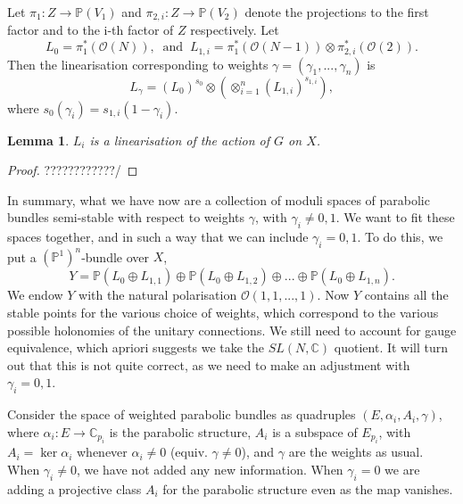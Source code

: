 \documentclass[]{article}
\newtheorem{lemma}{Lemma}
\newcommand{\C}{\mathbb{C}}
\newcommand{\OO}{\mathcal{O}}
\newcommand{\PP}{\mathbb{P}}
\begin{document}
	
	Let $\pi_1:Z \to \PP(V_1)$ and $\pi_{2,i}:Z\to \PP(V_2)$ denote the projections to the first factor and to the i-th factor of $Z$ respectively. Let
	\begin{equation}
		L_0 = \pi_1^\ast(\OO(N)),~ \text{ and } ~ L_{1,i} = \pi_1^\ast(\OO(N-1))\otimes \pi_{2,i}^\ast (\OO(2)).
	\end{equation}
	Then the linearisation corresponding to weights $\gamma = (\gamma_1,...,\gamma_n)$ is 
	\begin{equation}
		L_\gamma = (L_0)^{s_0} \otimes \left(
		\otimes_{i=1}^n (L_{1,i})^{s_{1,i}}
		\right),
	\end{equation}
	where $s_0(\gamma_i) = s_{1,i}(1-\gamma_i)$.
	\begin{lemma}
		$L_i$ is a linearisation of the action of $G$ on $X$.
	\end{lemma}
	\begin{proof}
		????????????/
	\end{proof}
	In summary, what we have now are a collection of moduli spaces of parabolic bundles semi-stable with respect to weights $\gamma$, with $\gamma_i \neq 0,1$. We want to fit these spaces together, and in such a way that we can include $\gamma_i = 0,1$. To do this, we put a $(\PP^1)^n$-bundle over $X$,
	\begin{equation}
		Y = \PP(L_0\oplus L_{1,1})\oplus \PP(L_0\oplus L_{1,2})\oplus ... \oplus \PP(L_0\oplus L_{1,n}).
	\end{equation}
	We endow $Y$ with the natural polarisation $\OO(1,1,...,1)$. Now $Y$ contains all the stable points for the various choice of weights, which correspond to the various possible holonomies of the unitary connections. We still need to account for gauge equivalence, which apriori suggests we take the $SL(N,\C)$ quotient. It will turn out that this is not quite correct, as we need to make an adjustment with $\gamma_i = 0,1$.
	
	Consider the space of weighted parabolic bundles as quadruples $(E, \alpha_i, A_i, \gamma)$, where $\alpha_i:E\to \C_{p_i}$ is the parabolic structure, $A_i$ is a subspace of $E_{p_i}$, with $A_i = \ker\alpha_i$ whenever $\alpha_i \neq 0$ (equiv. $\gamma \neq 0$), and $\gamma$ are the weights as usual. When $\gamma_i \neq 0$, we have not added any new information. When $\gamma_i = 0$ we are adding a projective class $A_i$ for the parabolic structure even as the map vanishes.
	
\end{document}

